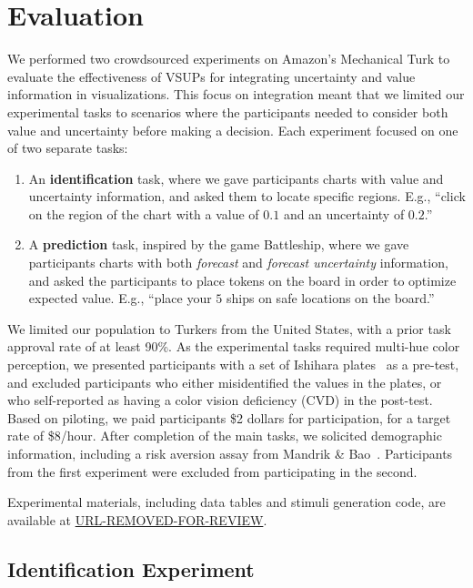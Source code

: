 \section{Evaluation}
\conditionFig

We performed two crowdsourced experiments on Amazon's Mechanical Turk to evaluate the effectiveness of VSUPs for integrating uncertainty and value information in visualizations. This focus on integration meant that we limited our experimental tasks to scenarios where the participants needed to consider both value and uncertainty before making a decision. Each experiment focused on one of two separate tasks:

\begin{enumerate}
	\item An \textbf{identification} task, where we gave participants charts with value and uncertainty information, and asked them to locate specific regions. E.g., ``click on the region of the chart with a value of $0.1$ and an uncertainty of $0.2$.''
	\item A \textbf{prediction} task, inspired by the game Battleship, where we gave participants charts with both \emph{forecast} and \emph{forecast uncertainty} information, and asked the participants to place tokens on the board in order to optimize expected value. E.g., ``place your $5$ ships on safe locations on the board.''
\end{enumerate}

We limited our population to Turkers from the United States, with a prior task approval rate of at least 90\%. As the experimental tasks required multi-hue color perception, we presented participants with a set of Ishihara plates~\cite{hardy1945tests} as a pre-test, and excluded participants who either misidentified the values in the plates, or who self-reported as having a color vision deficiency (CVD) in the post-test. Based on piloting, we paid participants \$2 dollars for participation, for a target rate of \$8/hour. After completion of the main tasks, we solicited demographic information, including a risk aversion assay from Mandrik \& Bao~\cite{mandrik2005exploring}. Participants from the first experiment were excluded from participating in the second.

Experimental materials, including data tables and stimuli generation code, are available at \url{URL-REMOVED-FOR-REVIEW}.

\subsection{Identification Experiment}

